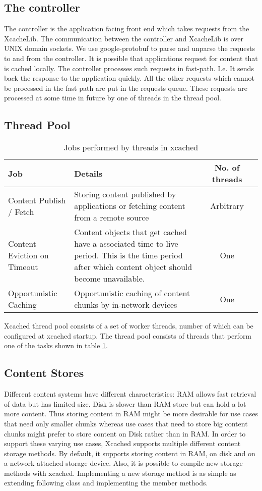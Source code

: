 \subsection{The controller}
The controller is the application facing front end which takes
requests from the XcacheLib. The communication between the controller and
XcacheLib is over UNIX domain sockets. We use google-protobuf to parse
and unparse the requests to and from the controller. It is possible that
applications request for content that is cached locally. The controller
processes such requests in fast-path. I.e. It sends back the response
to the application quickly. All the other requests which cannot be
processed in the fast path are put in the requests queue. These
requests are processed at some time in future by one of threads in the
thread pool.

\subsection{Thread Pool}
\begin{table}
  \begin{center}
    \begin{tabular}
      { p{1in} | p{2.5in} | cp{0.5in} |}
      Job & Details & No. of threads \\
      \hline
      Content Publish / Fetch & Storing content published by applications or fetching content from a remote source &  Arbitrary\\
      \hline
      Content Eviction on Timeout & Content objects that get cached have a associated time-to-live period. This is the time period after which content object should become unavailable. & One \\
      \hline
      Opportunistic Caching & Opportunistic caching of content chunks
      by in-network devices & One\\
    \end{tabular}
    \caption{Jobs performed by threads in xcached}
  \end{center}
  \label{tab:threads}
\end{table}
Xcached thread pool consists of a set of worker threads, number of
which can be configured at xcached startup. The thread pool consists
of threads that perform one of the tasks shown in table
\ref{tab:threads}.
\subsection{Content Stores}
Different content systems have different characteristics: RAM allows
fast retrieval of data but has limited size. Disk is slower than RAM
store but can hold a lot more content. Thus storing content in RAM
might be more desirable for use cases that need only smaller chunks
whereas use cases that need to store big content chunks might prefer
to store content on Disk rather than in RAM. In order to support these
varying use cases, Xcached supports multiple different content storage
methods. By default, it supports storing content in RAM, on disk and
on a network attached storage device. Also, it is possible to compile
new storage methods with xcached. Implementing a new storage method is
as simple as extending following class and implementing the member
methods.

